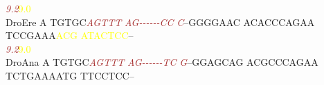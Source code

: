\documentclass[11pt,twoside,reqno,a4paper]{article}
\begin{document}
{\hspace*{7\charwidth}\hspace*{1\charwidth}\hspace*{6\charwidth}\textit{\textcolor{Brown}{9.2}}\hspace*{1\charwidth}\hspace*{1\charwidth}\hspace*{1\charwidth}\hspace*{1\charwidth}\hspace*{39\charwidth}\textcolor{Yellow}{9.0}\hspace*{1\charwidth}\\
DroEre	A	TGTGC\textit{\textcolor{Brown}{A}}\textit{\textcolor{Brown}{G}}\textit{\textcolor{Brown}{T}}\textit{\textcolor{Brown}{T}}\textit{\textcolor{Brown}{T}}	\textit{\textcolor{Brown}{A}}\textit{\textcolor{Brown}{G}}\textit{\textcolor{Brown}{-}}\textit{\textcolor{Brown}{-}}\textit{\textcolor{Brown}{-}}\textit{\textcolor{Brown}{-}}\textit{\textcolor{Brown}{-}}\textit{\textcolor{Brown}{-}}\textit{\textcolor{Brown}{C}}\textit{\textcolor{Brown}{C}}	\textit{\textcolor{Brown}{C}}--GGGGAAC	ACACCCAGAA	TCCGAAA\textcolor{Yellow}{A}\textcolor{Yellow}{C}\textcolor{Yellow}{G}	\textcolor{Yellow}{A}\textcolor{Yellow}{T}\textcolor{Yellow}{A}\textcolor{Yellow}{C}\textcolor{Yellow}{T}\textcolor{Yellow}{C}\textcolor{Yellow}{C}--\\
\hspace*{7\charwidth}\hspace*{1\charwidth}\hspace*{6\charwidth}\textit{\textcolor{Brown}{9.2}}\hspace*{1\charwidth}\hspace*{1\charwidth}\hspace*{1\charwidth}\hspace*{1\charwidth}\hspace*{39\charwidth}\textcolor{Yellow}{9.0}\hspace*{1\charwidth}\\
DroAna	A	TGTGC\textit{\textcolor{Brown}{A}}\textit{\textcolor{Brown}{G}}\textit{\textcolor{Brown}{T}}\textit{\textcolor{Brown}{T}}\textit{\textcolor{Brown}{T}}	\textit{\textcolor{Brown}{A}}\textit{\textcolor{Brown}{G}}\textit{\textcolor{Brown}{-}}\textit{\textcolor{Brown}{-}}\textit{\textcolor{Brown}{-}}\textit{\textcolor{Brown}{-}}\textit{\textcolor{Brown}{-}}\textit{\textcolor{Brown}{-}}\textit{\textcolor{Brown}{T}}\textit{\textcolor{Brown}{C}}	\textit{\textcolor{Brown}{G}}--GGAGCAG	ACGCCCAGAA	TCTGAAAATG	TTCCTCC--\\
}
\end{document}
